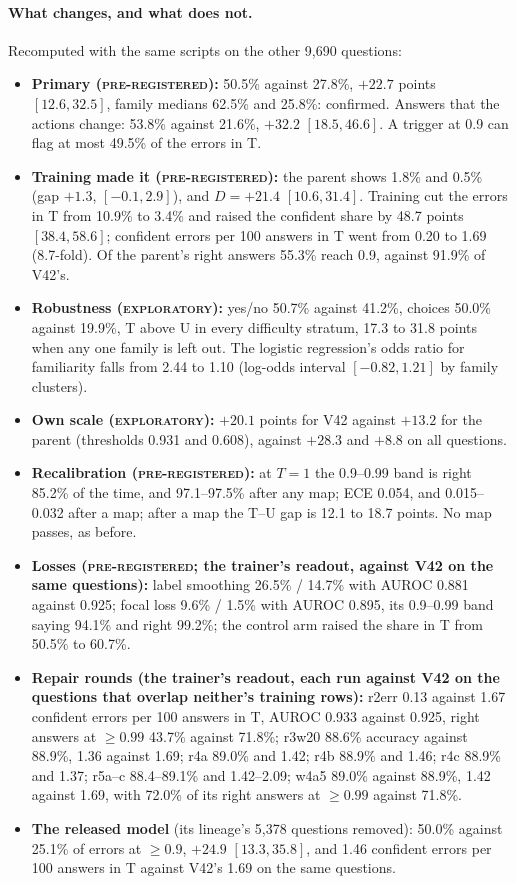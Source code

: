 \documentclass[11pt]{article}
\newcommand{\prereg}{\textsc{pre-registered}}
\newcommand{\explo}{\textsc{exploratory}}
\begin{document}
\paragraph{What changes, and what does not.} Recomputed with the same scripts on the other 9,690 questions:
\begin{itemize}
  \item \textbf{Primary (\prereg):} 50.5\% against 27.8\%, $+22.7$ points $[12.6, 32.5]$, family medians 62.5\% and
  25.8\%: confirmed. Answers that the actions change: 53.8\% against 21.6\%, $+32.2$ $[18.5, 46.6]$. A trigger at 0.9
  can flag at most 49.5\% of the errors in T.
  \item \textbf{Training made it (\prereg):} the parent shows 1.8\% and 0.5\% (gap $+1.3$, $[-0.1, 2.9]$), and
  $D = +21.4$ $[10.6, 31.4]$. Training cut the errors in T from 10.9\% to 3.4\% and raised the confident share by 48.7
  points $[38.4, 58.6]$; confident errors per 100 answers in T went from 0.20 to 1.69 (8.7-fold). Of the parent's right
  answers 55.3\% reach 0.9, against 91.9\% of V42's.
  \item \textbf{Robustness (\explo):} yes/no 50.7\% against 41.2\%, choices 50.0\% against 19.9\%, T above U in every
  difficulty stratum, 17.3 to 31.8 points when any one family is left out. The logistic regression's odds ratio for
  familiarity falls from 2.44 to 1.10 (log-odds interval $[-0.82, 1.21]$ by family clusters).
  \item \textbf{Own scale (\explo):} $+20.1$ points for V42 against $+13.2$ for the parent (thresholds 0.931 and
  0.608), against $+28.3$ and $+8.8$ on all questions.
  \item \textbf{Recalibration (\prereg):} at $T{=}1$ the 0.9--0.99 band is right 85.2\% of the time, and 97.1--97.5\%
  after any map; ECE 0.054, and 0.015--0.032 after a map; after a map the T--U gap is 12.1 to 18.7 points. No map
  passes, as before.
  \item \textbf{Losses (\prereg; the trainer's readout, against V42 on the same questions):} label smoothing 26.5\% /
  14.7\% with AUROC 0.881 against 0.925; focal loss 9.6\% / 1.5\% with AUROC 0.895, its 0.9--0.99 band saying 94.1\%
  and right 99.2\%; the control arm raised the share in T from 50.5\% to 60.7\%.
  \item \textbf{Repair rounds (the trainer's readout, each run against V42 on the questions that overlap neither's
  training rows):} r2err 0.13 against 1.67 confident errors per 100 answers in T, AUROC 0.933 against 0.925, right
  answers at $\ge 0.99$ 43.7\% against 71.8\%; r3w20 88.6\% accuracy against 88.9\%, 1.36 against 1.69; r4a 89.0\% and
  1.42; r4b 88.9\% and 1.46; r4c 88.9\% and 1.37; r5a--c 88.4--89.1\% and 1.42--2.09; w4a5 89.0\% against 88.9\%,
  1.42 against 1.69, with 72.0\% of its right answers at $\ge 0.99$ against 71.8\%.
  \item \textbf{The released model} (its lineage's 5,378 questions removed): 50.0\% against 25.1\% of errors at
  $\ge 0.9$, $+24.9$ $[13.3, 35.8]$, and 1.46 confident errors per 100 answers in T against V42's 1.69 on the same
  questions.
\end{itemize}
\end{document}
